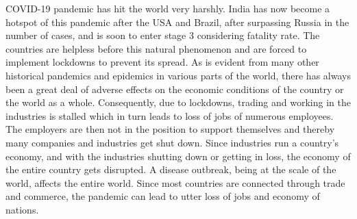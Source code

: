 \documentclass[10pt,journal,compsoc]{IEEEtran}
\begin{document}
\maketitle


\IEEEdisplaynontitleabstractindextext



%
\IEEEpeerreviewmaketitle



 COVID-19 pandemic has hit the world very harshly. India has now become a hotspot of this pandemic after the USA and Brazil, after surpassing Russia in the number of cases, and is soon to enter stage 3 considering fatality rate. The countries are helpless before this natural phenomenon and are forced to implement lockdowns to prevent its spread. As is evident from many other historical pandemics and epidemics in various parts of the world, there has always been a great deal of adverse effects on the economic conditions of the country or the world as a whole. Consequently, due to lockdowns, trading and working in the industries is stalled which in turn leads to loss of jobs of numerous employees. The employers are then not in the position to support themselves and thereby many companies and industries get shut down. Since industries run a country's economy, and with the industries shutting down or getting in loss, the economy of the entire country gets disrupted. A disease outbreak, being at the scale of the world, affects the entire world. Since most countries are connected through trade and commerce, the pandemic can lead to utter loss of jobs and economy of nations.
\end{document}
